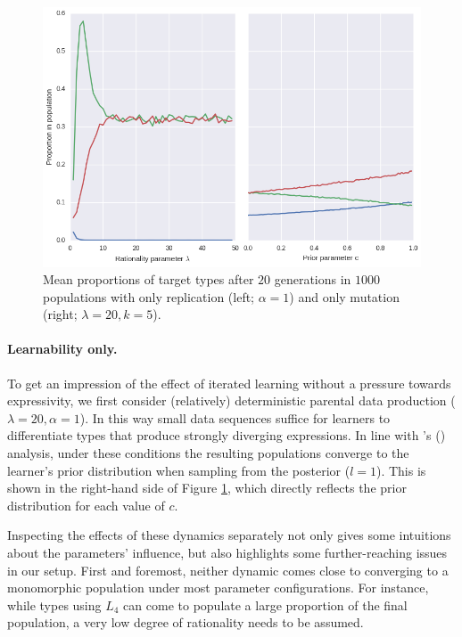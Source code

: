 \documentclass[a4paper]{article}
\newcommand{\citeposs}[2][]{\citeauthor{#2}'s (\citeyear[#1]{#2})}
\begin{document}
\begin{figure}
\centering
\includegraphics[scale=.5]{./only-R-or-M}
\caption{Mean proportions of target types after $20$ generations in $1000$ populations with only replication (left; $\alpha = 1$) and only mutation (right; $\lambda = 20, k = 5$).}
\label{fig:either-R-or-M}
\end{figure}

\paragraph{Learnability only.} To get an impression of the effect of iterated learning without a pressure towards expressivity, we first consider (relatively) deterministic parental data production ($\lambda = 20, \alpha = 1$). In this way small data sequences suffice for learners to differentiate types that produce strongly diverging expressions. In line with \citeposs{griffiths+kalish:2007} analysis, under these conditions the resulting populations converge to the learner's prior distribution when sampling from the posterior ($l = 1$). This is shown in the right-hand side of Figure \ref{fig:either-R-or-M}, which directly reflects the prior distribution for each value of $c$.

Inspecting the effects of these dynamics separately not only gives some intuitions about the parameters' influence, but also highlights some further-reaching issues in our setup. First and foremost, neither dynamic comes close to converging to a monomorphic population under most parameter configurations. For instance, while types using $L_4$ can come to populate a large proportion of the final population, a very low degree of rationality needs to be assumed. 
\end{document}
